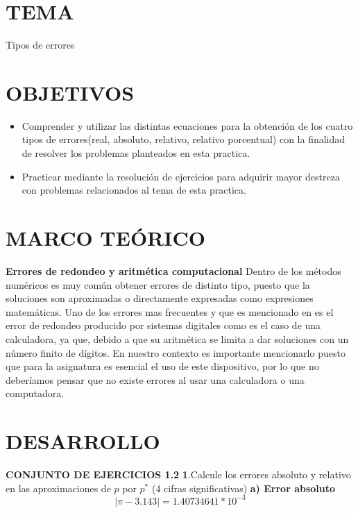 \documentclass[12pt]{article}
\begin{document}
\section*{TEMA}
Tipos de errores

\vspace{0.5cm}

\section*{OBJETIVOS}
\begin{itemize}
    \item Comprender y utilizar las distintas ecuaciones para la obtención de los cuatro tipos de errores(real, absoluto, relativo, relativo porcentual) con la finalidad de resolver los problemas planteados en esta practica.
    \item Practicar mediante la resolución de ejercicios para adquirir mayor destreza con problemas relacionados al tema de esta practica.
\end{itemize}

\vspace{0.5cm}

\section*{MARCO TEÓRICO}

\large\textbf{Errores de redondeo y aritmética computacional}
\normalsize\newline\newline
Dentro de los métodos numéricos es muy común obtener errores de distinto tipo, puesto que la soluciones son aproximadas o  directamente expresadas como expresiones matemáticas.
Uno de los errores mas frecuentes y que es mencionado en \cite{book:2608618} es el error de redondeo producido por sistemas digitales como es el caso de una calculadora, ya que, debido a que su aritmética se limita a dar soluciones con un número finito de dígitos. 
En nuestro contexto es importante mencionarlo puesto que para la asignatura es esencial el uso de este dispositivo, por lo que no deberíamos pensar que no existe errores al usar una calculadora o una computadora.
\vspace{0.5cm}

\section*{DESARROLLO}
\large\textbf{CONJUNTO DE EJERCICIOS 1.2}
\normalsize\newline
\textbf{1}.Calcule los errores absoluto y relativo en las aproximaciones de $p$ por $p^{*}$ (4 cifras significativas)
\newline\textbf{a) Error absoluto}
$$\left| \pi -3.143 \right| = 1.40734641*10^{-3}$$
\end{document}
